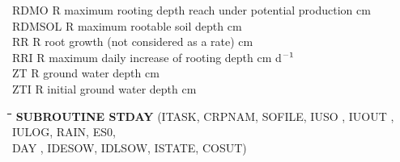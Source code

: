 \documentclass[11pt]{article}
\begin{document}
\begin{tabbing}
RDMO\> \> R\> maximum rooting depth reach under potential production\> \> \> \> \> \> \> cm\\
RDMSOL\> \> R\> maximum rootable soil depth\> \> \> \> \> \> \> cm\\
RR\> \> R\> root growth (not considered as a rate)\> \> \> \> \> \> \> cm \\
RRI\> \> R\> maximum daily increase of rooting depth\> \> \> \> \> \> \> cm d$^{{\rm -1}}$\\
ZT\> \> R\> ground water depth\> \> \> \> \> \> \> cm\\
ZTI\> \> R\> initial ground water depth\> \> \> \> \> \> \> cm
\end{tabbing}

\bigskip
\bigskip
\bigskip
\nwln
\begin{tabbing}
\hspace{1.27cm}\=\hspace{1.27cm}\=\hspace{1.27cm}\=\hspace{1.27cm}\=%
\hspace{1.27cm}\=\hspace{1.27cm}\=\hspace{1.27cm}\=\hspace{1.27cm}\=%
\hspace{1.27cm}\=\hspace{1.27cm}\=\kill
{\bf SUBROUTINE STDAY}\> \> \> (ITASK, CRPNAM, SOFILE, IUSO  , IUOUT , IULOG, RAIN, ES0,\\
\>\> \>  DAY , IDESOW, IDLSOW, ISTATE, COSUT)
\end{tabbing}
\nwln
\end{document}
